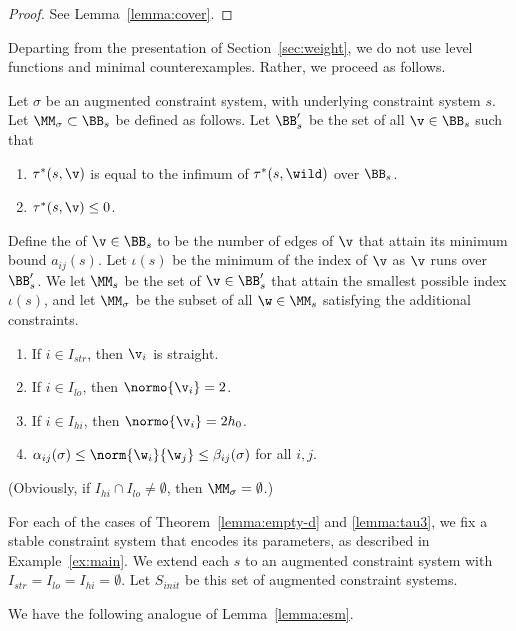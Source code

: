 \begin{proof} See Lemma~\ref{lemma:cover}.
\end{proof}

Departing from the presentation of Section~\ref{sec:weight}, we do not
use level functions and minimal counterexamples.  Rather, we proceed
as follows.


\begin{definition} 
Let $\sigma$ be an augmented constraint system,
with underlying constraint system $s$.
Let $\MM_{\sigma}\subset \BB_{s}$ be defined as follows.
Let $\BB'_{s}$ be the set of all $\v\in \BB_{s}$ such that
\begin{enumerate}
\item $\tau^*(s,\v)$ is equal to the infimum of $\tau^*(s,\wild)$ over $\BB_{s}$.
\item $\tau^*(s,\v)\le 0$.
\end{enumerate}
Define the  of $\v\in \BB_s$ to be the number of edges of $\v$
that attain its minimum bound $a_{i j}(s)$.  Let $\iota(s)$ be the minimum
of the index of $\v$ as $\v$ runs over $\BB'_s$.  
We let $\MM_{s}$  be the set of $\v\in \BB'_{s}$ that attain
the smallest possible index $\iota(s)$,
and let $\MM_\sigma$ be the subset of all $\w\in\MM_s$ satisfying the additional
constraints.
\begin{enumerate}
\item If $i\in I_{str}$,  then $\v_i$ is straight.
\item If $i\in I_{lo}$,  then $\normo{\v_i}=2$.
\item If $i\in I_{hi}$,  then $\normo{\v_i}=2h_0$.
\item $\alpha_{ij}(\sigma)\le \norm{\w_i}{\w_j}\le \beta_{ij}(\sigma)$ for all $i,j$.
\end{enumerate}
\end{definition}

(Obviously, if $I_{hi}\cap I_{lo}\ne \emptyset$, then $\MM_\sigma=\emptyset$.)


\begin{definition}[$S_{init}$] 
For each of the cases of Theorem~\ref{lemma:empty-d} and \ref{lemma:tau3}, we fix a
stable constraint system that encodes its parameters, as described in Example~\ref{ex:main}. 
We extend each $s$ to an augmented constraint system with $I_{str}=I_{lo}=I_{hi}=\emptyset$.
Let $S_{init}$ be this set of  augmented constraint systems.
\end{definition}

We have the following analogue of Lemma~\ref{lemma:esm}.

